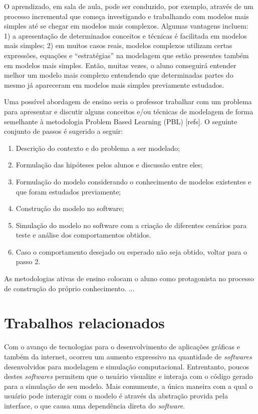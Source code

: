 \documentclass[
	12pt,				%
	openright,			%
	oneside,			%
	a4paper,			%
	main=brazil,
	english,			%
	]{ufsj-abntex2}
\begin{document}
O aprendizado, em sala de aula, pode ser conduzido, por exemplo, através de um processo incremental que começa investigando e trabalhando com modelos mais simples até se chegar em modelos mais complexos. Algumas vantagens incluem:  1) a apresentação de determinados conceitos e técnicas é facilitada em modelos mais simples; 2) em muitos casos reais, modelos complexos utilizam certas expressões, equações e “estratégias” na modelagem que estão presentes também em modelos mais simples. Então, muitas vezes, o aluno conseguirá entender melhor um modelo mais complexo entendendo que determinadas partes do mesmo já apareceram em modelos mais simples previamente estudados. 

Uma possível abordagem de ensino seria o professor trabalhar com um problema para apresentar e discutir alguns conceitos e/ou técnicas de modelagem de forma semelhante à metodologia Problem Based Learning (PBL) [refs]. O seguinte conjunto de passos é sugerido a seguir: 

\begin{enumerate}
 \item Descrição do contexto e do problema a ser modelado;
 \item Formulação das hipóteses pelos alunos e discussão entre eles;
 \item Formulação do modelo considerando o conhecimento de modelos existentes e que foram estudados previamente;
 \item Construção do modelo no software;
 \item Simulação do modelo no software com a criação de diferentes cenários para teste e análise dos comportamentos obtidos.
 \item Caso o comportamento desejado ou esperado não seja obtido, voltar para o passo 2.
\end{enumerate}

As metodologias ativas de ensino colocam o aluno como protagonista no processo de construção do próprio conhecimento. ... 

\chapter{Trabalhos relacionados}
\label{chap:relacionados}

Com o avanço de tecnologias para o desenvolvimento de aplicações gráficas e também da internet, ocorreu um aumento expressivo na quantidade de \textit{softwares} desenvolvidos para modelagem e simulação computacional. Entrentanto, poucos destes \textit{softwares} permitem que o usuário visualize e interaja com o código gerado para a simulação de seu modelo. Mais comumente, a única maneira com a qual o usuário pode interagir com o modelo é através da abstração provida pela interface, o que causa uma dependência direta do \textit{software}.
\end{document}
